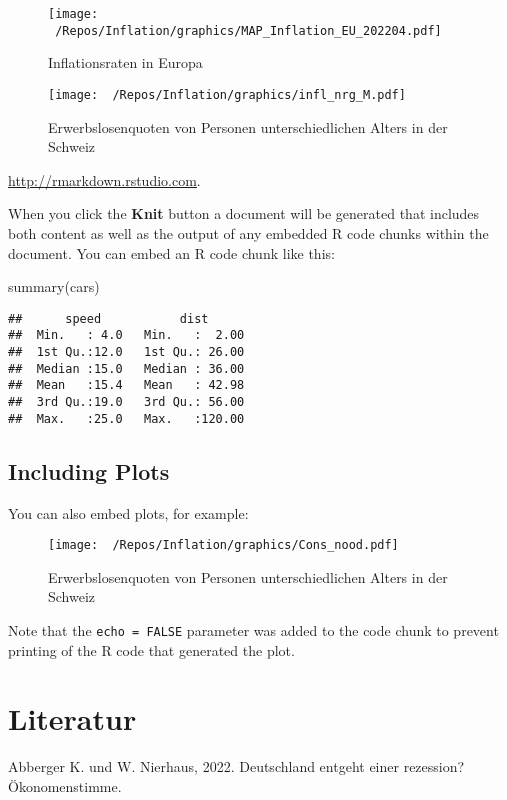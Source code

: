\documentclass[
]{article}
\newenvironment{Shaded}{\begin{snugshade}}{\end{snugshade}}
\newcommand{\FunctionTok}[1]{\textcolor[rgb]{0.00,0.00,0.00}{#1}}
\newcommand{\NormalTok}[1]{#1}
\newlength{\cslhangindent}
\newlength{\cslentryspacingunit} %
\newenvironment{CSLReferences}[2] %
 {%
  \setlength{\parindent}{0pt}
  \ifodd #1
  \let\oldpar\par
  \def\par{\hangindent=\cslhangindent\oldpar}
  \fi
  \setlength{\parskip}{#2\cslentryspacingunit}
 }%
 {}
\begin{document}
\begin{figure} \centering
\texttt{[image: ~/Repos/Inflation/graphics/MAP\_Inflation\_EU\_202204.pdf]}
\caption{Inflationsraten in Europa}
\label{Inf_A}
\end{figure}

\begin{figure} \centering
\texttt{[image: ~/Repos/Inflation/graphics/infl\_nrg\_M.pdf]}
\caption{Erwerbslosenquoten von Personen unterschiedlichen Alters in der Schweiz}
\label{Inf_A}
\end{figure}

\url{http://rmarkdown.rstudio.com}.

When you click the \textbf{Knit} button a document will be generated
that includes both content as well as the output of any embedded R code
chunks within the document. You can embed an R code chunk like this:

\begin{Shaded}
\begin{Highlighting}[]
\FunctionTok{summary}\NormalTok{(cars)}
\end{Highlighting}
\end{Shaded}

\begin{verbatim}
##      speed           dist       
##  Min.   : 4.0   Min.   :  2.00  
##  1st Qu.:12.0   1st Qu.: 26.00  
##  Median :15.0   Median : 36.00  
##  Mean   :15.4   Mean   : 42.98  
##  3rd Qu.:19.0   3rd Qu.: 56.00  
##  Max.   :25.0   Max.   :120.00
\end{verbatim}

\hypertarget{including-plots}{%
\subsection{Including Plots}\label{including-plots}}

You can also embed plots, for example:

\begin{figure} \centering
 \texttt{[image: ~/Repos/Inflation/graphics/Cons\_nood.pdf]}
\caption{Erwerbslosenquoten von Personen unterschiedlichen Alters in der Schweiz}
\label{Inf_A}
\end{figure}

Note that the \texttt{echo\ =\ FALSE} parameter was added to the code
chunk to prevent printing of the R code that generated the plot.

\hypertarget{literatur}{%
\section*{Literatur}\label{literatur}}

\hypertarget{refs}{}
\begin{CSLReferences}{1}{0}
\leavevmode{}%
Abberger K. und W. Nierhaus, 2022. Deutschland entgeht einer rezession?
Ökonomenstimme.

\end{CSLReferences}
\end{document}
